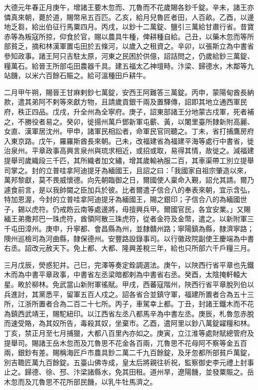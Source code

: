 \begin{pinyinscope}
 大德元年春正月庚午，增諸王要木忽而、兀魯而不花歲賜各鈔千錠。辛未，諸王亦憐真來朝，薨於道，賜幣帛五百匹。乙亥，給月兒魯匠者田，人百畝。乙酉，以邊地乏芻，給出伯征行馬粟四月。丙戌，以鈔十二萬錠、鹽引三萬給甘肅行省。昔寶赤等為叛寇所掠，仰食於官，賜以農具牛種，俾耕種自給。己丑，以藥木忽而等所部貧乏，摘和林漢軍置屯田於五條河，以歲入之租資之。辛卯，以張斯立為中書省參知政事。諸王阿只吉駐太原，河東之民困於供億，詔詰問之，仍歲給鈔三萬錠、糧萬石。給晉王所部屯田農器千具。建五福太乙神壇畤。汴梁、歸德水，木鄰等九站饑，以米六百餘石賑之。給可溫種田戶耕牛。



 二月甲午朔，賜晉王甘麻剌鈔七萬錠，安西王阿難答三萬錠。丙申，蒙陽甸酋長納款，遣其弟阿不剌等來獻方物，且請歲貢銀千兩及置驛傳，詔即其地立通西軍民府，秩正四品。戊戌，升全州為全寧府。庚子，詔東部諸王分地蒙古戍軍，死者補之，不勝役者易之。癸卯，徙揚州萬戶鄧新軍屯蘄、黃，以闍里臺所隸新附高麗、女直、漢軍居沈州。甲申，諸軍民相訟者，命軍民官同聽之。丁未，省打捕鷹房府入東京路。戊午，羅羅斯酋長來朝。己未，改福建省為福建平海等處行中書省，徙治泉州。平章政事高興言泉州與琉求相近，或招或取，易得其情，故徙之。減福建提舉司歲織段三千匹，其所織者加文繡，增其歲輸衲服二百，其車渠帶工別立提舉司掌之。封的立普哇拿阿迪提牙為緬國王，且詔之曰：「我國家自祖宗肇造以來，萬邦黎獻，莫不畏威懷德。向先朝臨御之日，爾國使人稟命入覲，詔允其請。爾乃遽食前言，是以我帥閫之臣加兵於彼。比者爾遣子信合八的奉表來朝，宜示含弘，特加恩渥，今封的立普哇拿阿迪提牙為緬國王，賜之銀印；子信合八的為緬國世子，錫以虎符。仍戒飭云南等處邊將，毋擅興兵甲。爾國官民，各宜安業。」又賜緬王弟撒邦巴一珠虎符，酋領阿散三珠虎符，從者金符及金幣，遣之。以新附軍三千屯田漳州。庚申，升寧都、會昌縣為州，並隸贛州路；寧陽鎮為縣，隸濟寧路；隩州巡檢司為河曲縣，隸保德州。安豐路設錄事司。以行徽政院副使王慶端為中書右丞。詔改元赦天下。免上都、大都、隆興差稅三年，給也只所部六千戶糧三月。



 三月戊辰，熒惑犯井。己巳，完澤等奏定銓調選法。庚午，以陜西行省平章也先鐵木而為中書平章政事，中書省左丞梁暗都剌為中書省右丞。癸酉，太陰掩軒轅大星。畋於柳林。免武當山新附軍徭賦。甲戌，西蕃寇階州，陜西行省平章脫列伯以兵進討，其黨悉平，留軍五百人戍之。詔各省合並鎮守軍，福建所置者合為五十三所，江浙所置者合為二百二十七所。丙子，車駕幸上都。丁丑，封諸王鐵木而不花為鎮西武靖王，賜駝紐印。以江西省左丞八都馬辛為中書左丞。庚辰，札魯忽赤脫而速受賂，為其奴所告，毒殺其奴，坐棄市。乙酉，遣阿里以鈔八萬錠糴糧和林。丁亥，禁正月至七月捕獵，大都八百里內亦如之。庚寅，立江淮等處財賦總管府及提舉司。賜諸王岳木忽而及兀魯思不花金各百兩，兀魯思不花母阿不察等金五百兩，銀鈔有差。賜稱海匠戶市農具鈔二萬二千九百餘錠，及牙忽都所部貧戶萬錠，別吉韂匠萬九百餘錠。五臺山佛寺成，皇太后將親往祈祝，監察御史李元禮上封事止之。歸德、徐、邳、汴梁諸縣水，免其田租。道州旱，遼陽饑，並發粟賑之。岳木忽而及兀魯思不花所部民饑，以乳牛牡馬濟之。




\end{pinyinscope}
